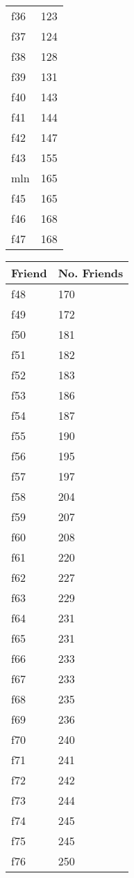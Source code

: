 \begin{table}[!htbp]
\begin{center}
\begin{minipage}{0.22\textwidth}
\begin{tabular}{|l | l|}
			f36 & 123\\
			f37 & 124\\
			f38 & 128\\
			f39 & 131\\
			f40 & 143\\
			f41 & 144\\
			f42 & 147\\
			f43 & 155\\
			mln & 165\\
			f45 & 165\\
			f46 & 168\\
			f47 & 168\\
			\hline
		\end{tabular}
	\end{minipage}	
	\begin{minipage}{0.22\textwidth}
		\begin{tabular}{|l | l|}
			\hline
			\multicolumn{1}{|c|}{Friend} & \multicolumn{1}{c|}{No. Friends}\\
			\hline
			f48 & 170\\
			f49 & 172\\
			f50 & 181\\
			f51 & 182\\
			f52 & 183\\
			f53 & 186\\
			f54 & 187\\
			f55 & 190\\
			f56 & 195\\
			f57 & 197\\
			f58 & 204\\
			f59 & 207\\
			f60 & 208\\
			f61 & 220\\
			f62 & 227\\
			f63 & 229\\
			f64 & 231\\
			f65 & 231\\
			f66 & 233\\
			f67 & 233\\
			f68 & 235\\
			f69 & 236\\
			f70 & 240\\
			f71 & 241\\
			f72 & 242\\
			f73 & 244\\
			f74 & 245\\
			f75 & 245\\
			f76 & 250\\

\end{tabular}
\end{minipage}
\end{center}
\end{table}

